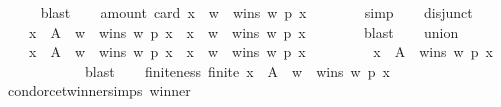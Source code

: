\begin{isabellebody}
\ \ \ \ \isamarkupfalse%
\ blast\isanewline
\ \ \isamarkupfalse%
\ amount{}{\isacharcolon}{\kern0pt}\ {\isachardoublequoteopen}card\ {\isacharbraceleft}{\kern0pt}x\ {\isasymin}\ {\isacharbraceleft}{\kern0pt}w{\isacharbraceright}{\kern0pt}\ {\isachardot}{\kern0pt}\ wins\ w\ p\ x{\isacharbraceright}{\kern0pt}\ {\isacharequal}{\kern0pt}\ {}{\isachardoublequoteclose}\isanewline
\ \ \ \ \isamarkupfalse%
\ simp\isanewline
\ \ \isamarkupfalse%
\ disjunct{\isacharcolon}{\kern0pt}\isanewline
\ \ \ \ {\isachardoublequoteopen}{\isacharbraceleft}{\kern0pt}x\ {\isasymin}\ A\ {\isacharminus}{\kern0pt}\ {\isacharbraceleft}{\kern0pt}w{\isacharbraceright}{\kern0pt}\ {\isachardot}{\kern0pt}\ wins\ w\ p\ x{\isacharbraceright}{\kern0pt}\ {\isasyminter}\ {\isacharbraceleft}{\kern0pt}x\ {\isasymin}\ {\isacharbraceleft}{\kern0pt}w{\isacharbraceright}{\kern0pt}\ {\isachardot}{\kern0pt}\ wins\ w\ p\ x{\isacharbraceright}{\kern0pt}\ {\isacharequal}{\kern0pt}\ {\isacharbraceleft}{\kern0pt}{\isacharbraceright}{\kern0pt}{\isachardoublequoteclose}\isanewline
\ \ \ \ \isamarkupfalse%
\ blast\isanewline
\ \ \isamarkupfalse%
\ union{\isacharcolon}{\kern0pt}\isanewline
\ \ \ \ {\isachardoublequoteopen}{\isacharbraceleft}{\kern0pt}x\ {\isasymin}\ A\ {\isacharminus}{\kern0pt}\ {\isacharbraceleft}{\kern0pt}w{\isacharbraceright}{\kern0pt}\ {\isachardot}{\kern0pt}\ wins\ w\ p\ x{\isacharbraceright}{\kern0pt}\ {\isasymunion}\ {\isacharbraceleft}{\kern0pt}x\ {\isasymin}\ {\isacharbraceleft}{\kern0pt}w{\isacharbraceright}{\kern0pt}\ {\isachardot}{\kern0pt}\ wins\ w\ p\ x{\isacharbraceright}{\kern0pt}\ {\isacharequal}{\kern0pt}\isanewline
\ \ \ \ \ \ \ \ {\isacharbraceleft}{\kern0pt}x\ {\isasymin}\ A\ {\isachardot}{\kern0pt}\ wins\ w\ p\ x{\isacharbraceright}{\kern0pt}{\isachardoublequoteclose}\isanewline
\ \ \ \ \isamarkupfalse%
\ {\isachardoublequoteopen}{}{\isachardoublequoteclose}\isanewline
\ \ \ \ \isamarkupfalse%
\ blast\isanewline
\ \ \isamarkupfalse%
\ finiteness{}{\isacharcolon}{\kern0pt}\ {\isachardoublequoteopen}finite\ {\isacharbraceleft}{\kern0pt}x\ {\isasymin}\ A\ {\isacharminus}{\kern0pt}\ {\isacharbraceleft}{\kern0pt}w{\isacharbraceright}{\kern0pt}\ {\isachardot}{\kern0pt}\ wins\ w\ p\ x{\isacharbraceright}{\kern0pt}{\isachardoublequoteclose}\isanewline
\ \ \ \ \isamarkupfalse%
\ condorcet{\isacharunderscore}{\kern0pt}winner{\isachardot}{\kern0pt}simps\ winner\isanewline

\end{isabellebody}
